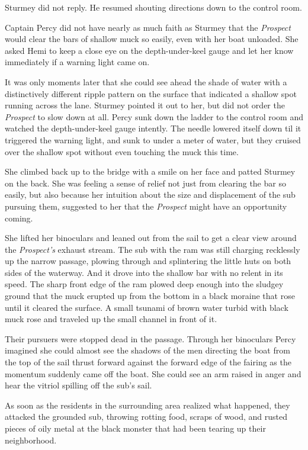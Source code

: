 \documentclass[]{scrbook}
\begin{document}
Sturmey did not reply. He resumed shouting directions down to the
control room.

Captain Percy did not have nearly as much faith as Sturmey that the
\emph{Prospect} would clear the bars of shallow muck so easily, even
with her boat unloaded. She asked Hemi to keep a close eye on the
depth-under-keel gauge and let her know immediately if a warning light
came on.

It was only moments later that she could see ahead the shade of water
with a distinctively different ripple pattern on the surface that
indicated a shallow spot running across the lane. Sturmey pointed it out
to her, but did not order the \emph{Prospect} to slow down at all. Percy
sunk down the ladder to the control room and watched the
depth-under-keel gauge intently. The needle lowered itself down til it
triggered the warning light, and sunk to under a meter of water, but
they cruised over the shallow spot without even touching the muck this
time.

She climbed back up to the bridge with a smile on her face and patted
Sturmey on the back. She was feeling a sense of relief not just from
clearing the bar so easily, but also because her intuition about the
size and displacement of the sub pursuing them, suggested to her that
the \emph{Prospect} might have an opportunity coming.

She lifted her binoculars and leaned out from the sail to get a clear
view around the \emph{Prospect's} exhaust stream. The sub with the ram
was still charging recklessly up the narrow passage, plowing through and
splintering the little huts on both sides of the waterway. And it drove
into the shallow bar with no relent in its speed. The sharp front edge
of the ram plowed deep enough into the sludgey ground that the muck
erupted up from the bottom in a black moraine that rose until it cleared
the surface. A small tsunami of brown water turbid with black muck rose
and traveled up the small channel in front of it.

Their pursuers were stopped dead in the passage. Through her binoculars
Percy imagined she could almost see the shadows of the men directing the
boat from the top of the sail thrust forward against the forward edge of
the fairing as the momentum suddenly came off the boat. She could see an
arm raised in anger and hear the vitriol spilling off the sub's sail.

As soon as the residents in the surrounding area realized what happened,
they attacked the grounded sub, throwing rotting food, scraps of wood,
and rusted pieces of oily metal at the black monster that had been
tearing up their neighborhood.
\end{document}
